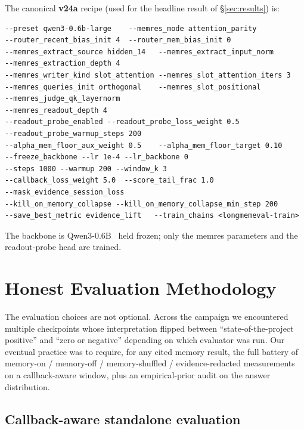 \documentclass[11pt]{article}
\begin{document}
The canonical \textbf{v24a} recipe (used for the headline result of
\S\ref{sec:results}) is:
\vspace{0.4em}
{\small
\begin{verbatim}
--preset qwen3-0.6b-large    --memres_mode attention_parity
--router_recent_bias_init 4  --router_mem_bias_init 0
--memres_extract_source hidden_14   --memres_extract_input_norm
--memres_extraction_depth 4
--memres_writer_kind slot_attention --memres_slot_attention_iters 3
--memres_queries_init orthogonal    --memres_slot_positional
--memres_judge_qk_layernorm
--memres_readout_depth 4
--readout_probe_enabled --readout_probe_loss_weight 0.5
--readout_probe_warmup_steps 200
--alpha_mem_floor_aux_weight 0.5    --alpha_mem_floor_target 0.10
--freeze_backbone --lr 1e-4 --lr_backbone 0
--steps 1000 --warmup 200 --window_k 3
--callback_loss_weight 5.0  --score_tail_frac 1.0
--mask_evidence_session_loss
--kill_on_memory_collapse --kill_on_memory_collapse_min_step 200
--save_best_metric evidence_lift   --train_chains <longmemeval-train>
\end{verbatim}}
The backbone is Qwen3-0.6B~\citep{qwen3} held frozen; only the memres
parameters and the readout-probe head are trained.

\section{Honest Evaluation Methodology}
\label{sec:eval}

The evaluation choices are not optional. Across the campaign we
encountered multiple checkpoints whose interpretation flipped between
``state-of-the-project positive'' and ``zero or negative'' depending
on which evaluator was run. Our eventual practice was to require, for
any cited memory result, the full battery of memory-on / memory-off /
memory-shuffled / evidence-redacted measurements on a callback-aware
window, plus an empirical-prior audit on the answer distribution.

\subsection{Callback-aware standalone evaluation}
\end{document}
